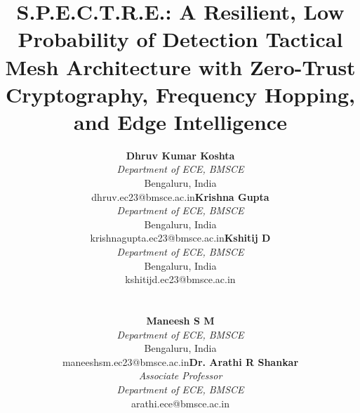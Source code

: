 \documentclass[conference]{IEEEtran}
\begin{document}
\setlength{\abovedisplayskip}{4pt plus 1pt minus 1pt}
\setlength{\belowdisplayskip}{4pt plus 1pt minus 1pt}
\setlength{\abovedisplayshortskip}{2pt plus 1pt minus 1pt}
\setlength{\belowdisplayshortskip}{2pt plus 1pt minus 1pt}

\title{S.P.E.C.T.R.E.: A Resilient, Low Probability of Detection Tactical Mesh Architecture with Zero-Trust Cryptography, Frequency Hopping, and Edge Intelligence}

\author{
\begin{minipage}{\linewidth}
\centering
\begin{tabular}[t]{p{5.4cm} p{5.4cm} p{5.4cm}}
\centering \textbf{Dhruv Kumar Koshta} \\
\textit{Department of ECE, BMSCE} \\
Bengaluru, India \\
dhruv.ec23@bmsce.ac.in
&
\centering \textbf{Krishna Gupta} \\
\textit{Department of ECE, BMSCE} \\
Bengaluru, India \\
krishnagupta.ec23@bmsce.ac.in
&
\centering \textbf{Kshitij D} \\
\textit{Department of ECE, BMSCE} \\
Bengaluru, India \\
kshitijd.ec23@bmsce.ac.in
\end{tabular}
\\[2.5ex]
\begin{tabular}[t]{p{6.5cm} p{6.5cm}}
\centering \textbf{Maneesh S M} \\
\textit{Department of ECE, BMSCE} \\
Bengaluru, India \\
maneeshsm.ec23@bmsce.ac.in
&
\centering \textbf{Dr. Arathi R Shankar} \\
\textit{Associate Professor} \\
\textit{Department of ECE, BMSCE} \\
arathi.ece@bmsce.ac.in
\end{tabular}
\end{minipage}
}

\maketitle
\end{document}
